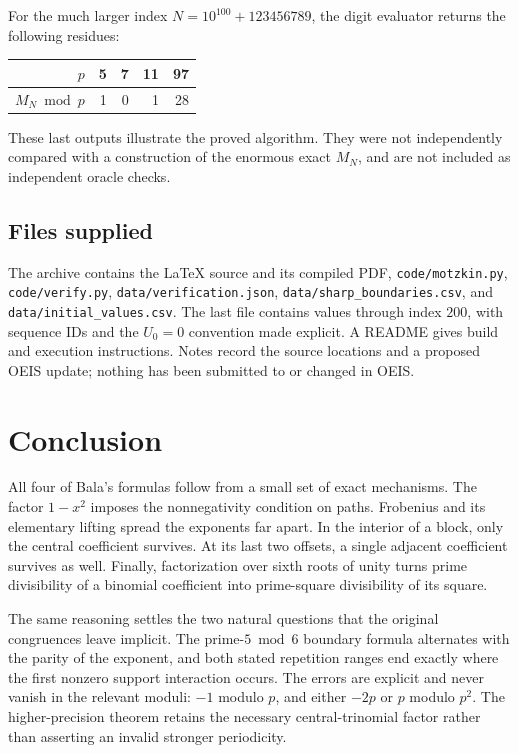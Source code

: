 \documentclass[11pt,a4paper]{article}
\numberwithin{equation}{section}
\theoremstyle{definition}
\theoremstyle{remark}
\begin{document}
For the much larger index $N=10^{100}+123456789$, the digit evaluator
returns the following residues:
\begin{center}
\begin{tabular}{@{}rrrrr@{}}
\toprule
$p$ & 5 & 7 & 11 & 97\\
\midrule
$M_N\bmod p$ & 1 & 0 & 1 & 28\\
\bottomrule
\end{tabular}
\end{center}
These last outputs illustrate the proved algorithm. They were not
independently compared with a construction of the enormous exact $M_N$,
and are not included as independent oracle checks.

\subsection{Files supplied}
The archive contains the \LaTeX{} source and its compiled PDF,
\nolinkurl{code/motzkin.py}, \nolinkurl{code/verify.py},
\nolinkurl{data/verification.json}, \nolinkurl{data/sharp_boundaries.csv},
and \nolinkurl{data/initial_values.csv}. The last file contains values
through index $200$, with sequence IDs and the $U_0=0$ convention made
explicit. A README gives build and execution instructions. Notes record
the source locations and a proposed OEIS update; nothing has been
submitted to or changed in OEIS.

\section{Conclusion}\label{sec:conclusion}
All four of Bala's formulas follow from a small set of exact mechanisms.
The factor $1-x^2$ imposes the nonnegativity condition on paths. Frobenius
and its elementary lifting spread the exponents far apart. In the
interior of a block, only the central coefficient survives. At its last
two offsets, a single adjacent coefficient survives as well. Finally,
factorization over sixth roots of unity turns prime divisibility of a
binomial coefficient into prime-square divisibility of its square.

The same reasoning settles the two natural questions that the original
congruences leave implicit. The prime-$5\bmod6$ boundary formula
alternates with the parity of the exponent, and both stated repetition
ranges end exactly where the first nonzero support interaction occurs.
The errors are explicit and never vanish in the relevant moduli:
$-1$ modulo $p$, and either $-2p$ or $p$ modulo $p^2$.
The higher-precision theorem retains the necessary central-trinomial
factor rather than asserting an invalid stronger periodicity.
\end{document}
